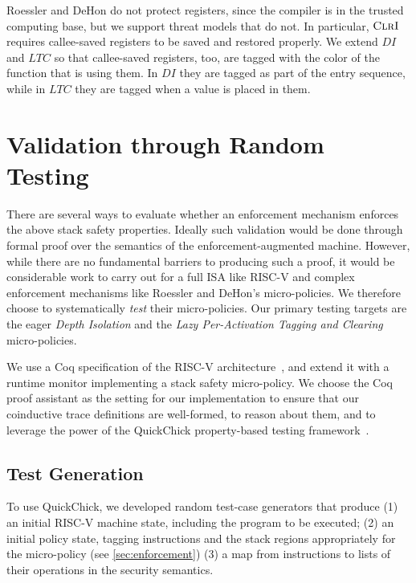 \documentclass[10pt,conference]{ieeetran}%
\theoremstyle{definition}
\begin{document}
Roessler and DeHon do not protect registers, since the compiler is in the
trusted computing base, but we support threat models that do not.
In particular, \(\textnormal{\sc ClrI}\) requires callee-saved
registers to be saved and restored properly. We extend \(DI\) and \(LTC\)
so that callee-saved registers, too, are tagged with the color of the
function that is using them. In \(DI\) they are tagged as part of the entry
sequence, while in \(LTC\) they are tagged when a value is placed in them.

\section{Validation through Random Testing}
\label{sec:testing}

There are several ways to evaluate whether an enforcement mechanism enforces the above
stack safety properties. Ideally such validation would be done through formal proof over
the semantics of the enforcement-augmented machine.
However, while there are no fundamental barriers to producing such a proof,
it would be considerable work to carry out for a full ISA like RISC-V and
complex enforcement mechanisms like Roessler and DeHon's micro-policies.
We therefore choose to systematically \emph{test} their micro-policies.
Our primary testing targets are the eager {\em Depth Isolation}
and the {\em Lazy Per-Activation Tagging and Clearing} micro-policies.


We use a Coq specification of the RISC-V architecture~\cite{Bourgeat2021AMF},
and extend it with a runtime monitor implementing a stack safety
micro-policy. We choose the Coq proof assistant as the setting for our implementation
to ensure that our coinductive trace definitions are well-formed, to reason about
them, and to leverage the power of the QuickChick property-based testing framework~\cite{Pierce:SF4}.

\subsection{Test Generation}
To use QuickChick, we developed random test-case generators that produce
(1) an initial RISC-V machine state, including the program to be executed;
(2)
  an initial policy state, tagging instructions and the stack regions appropriately
  for the micro-policy (see \cref{sec:enforcement})
(3)
  a map from instructions to lists of their operations in the security semantics.
\end{document}
